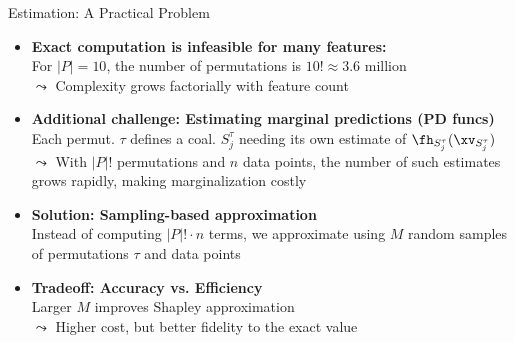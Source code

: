 \documentclass[10pt,compress,t,notes=noshow, xcolor=table]{beamer}
\newcommand{\Stau}{S_{j}^\tau}%
\begin{document}
\begin{framev}[align=top]{Estimation: A Practical Problem}
\begin{itemize}[<+->]
\item \textbf{Exact computation is infeasible for many features:}\\
For $|P| = 10$, the number of permutations is $10! \approx 3.6$ million\\
$\leadsto$ Complexity grows factorially with feature count
\item \textbf{Additional challenge: Estimating marginal predictions (PD funcs)}\\
Each permut. $\tau$ defines a coal. $\Stau$ needing its own estimate of $\fh_{\Stau}(\xv_{\Stau})$\\
$\leadsto$ With $|P|!$ permutations and $n$ data points, the number of such estimates grows rapidly, making marginalization costly
\item \textbf{Solution: Sampling-based approximation}\\
Instead of computing $|P|! \cdot n$ terms, we approximate using $M$ random samples of permutations $\tau$ and data points
\item \textbf{Tradeoff: Accuracy vs. Efficiency}\\
Larger $M$ improves Shapley approximation\\
$\leadsto$ Higher cost, but better fidelity to the exact value
\end{itemize}
\end{framev}


\newcommand{\xk}{\mathbf{x}^{(k)}}
\end{document}
